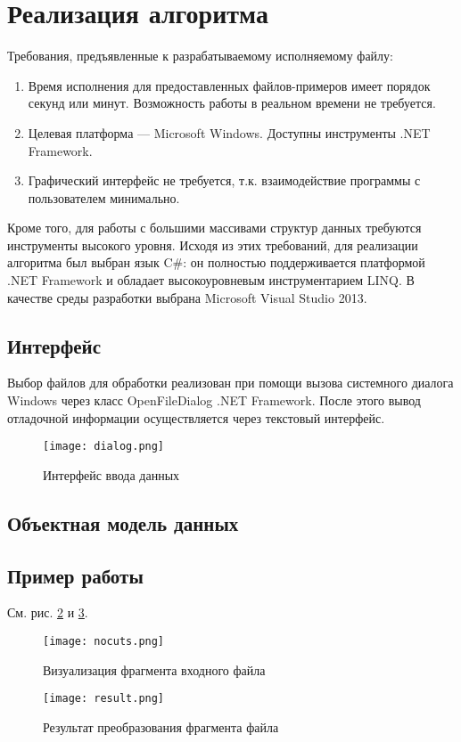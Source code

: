 \section{Реализация алгоритма}
\label{}

Требования, предъявленные к разрабатываемому исполняемому файлу:
\begin{enumerate}
\item Время исполнения для предоставленных файлов-примеров имеет порядок секунд или минут. Возможность работы в реальном времени не требуется.
\item Целевая платформа --- Microsoft Windows. Доступны инструменты .NET Framework.
\item Графический интерфейс не требуется, т.к. взаимодействие программы с пользователем минимально.
\end{enumerate}

Кроме того, для работы с большими массивами структур данных требуются инструменты высокого уровня. Исходя из этих требований, для реализации алгоритма был выбран язык C\#: он полностью поддерживается платформой .NET Framework и обладает высокоуровневым инструментарием LINQ. В качестве среды разработки выбрана Microsoft Visual Studio 2013.

\subsection{Интерфейс}
\label{}

Выбор файлов для обработки реализован при помощи вызова системного диалога Windows через класс OpenFileDialog .NET Framework. После этого вывод отладочной информации осуществляется через текстовый интерфейс.

\begin{figure}[!htb]
    \centering
    \texttt{[image: dialog.png]}
    \caption{Интерфейс ввода данных}
    \label{fig:dialog}
\end{figure}

\subsection{Объектная модель данных}
\label{}



\subsection{Пример работы}
\label{}

См. рис. \ref{fig:nocuts} и \ref{fig:result}.

\begin{figure}[!htb]
    \centering
    \texttt{[image: nocuts.png]}
    \caption{Визуализация фрагмента входного файла}
    \label{fig:nocuts}
\end{figure}

\begin{figure}[!htb]
    \centering
    \texttt{[image: result.png]}
    \caption{Результат преобразования фрагмента файла}
    \label{fig:result}
\end{figure}